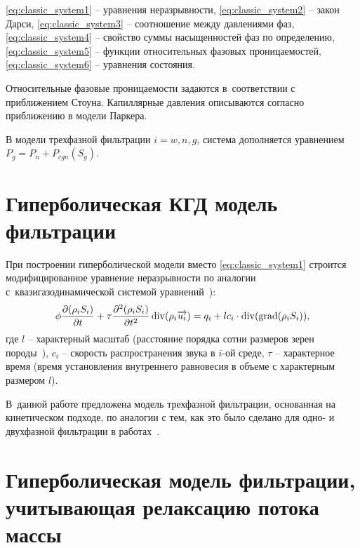\eqref{eq:classic_system1} -- уравнения неразрывности,
\eqref{eq:classic_system2} -- закон Дарси,
\eqref{eq:classic_system3} -- соотношение между давлениями фаз,
\eqref{eq:classic_system4} -- свойство суммы насыщенностей фаз по определению,
\eqref{eq:classic_system5} -- функции относительных фазовых проницаемостей,
\eqref{eq:classic_system6} -- уравнения состояния.

Относительные фазовые проницаемости задаются в~соответствии с~
приближением Стоуна\cite{Aziz-Settari}.
Капиллярные давления описываются согласно приближению в модели Паркера\cite{Parker}.

В модели трехфазной фильтрации $i = w,n,g$, система дополняется уравнением $P_g = P_n + P_{cgn}({S}_g)$.

\section{Гиперболическая КГД модель фильтрации} \label{sec:ch1/sec2}

При построении гиперболической модели вместо \eqref{eq:classic_system1} строится модифицированное уравнение неразрывности по аналогии с~квазигазодинамической системой уравнений~\cite{Chetverushkin-Mathmod}):
\begin{equation}
 \label{mass_mod}
  \phi \frac{\partial (\rho_i S_i)}{\partial t} + \tau \frac{\partial^2 (\rho_i S_i)}{\partial t^2} 
  \mathop{\mathrm{div}}\nolimits(\rho_i \overrightarrow{u_i}) = q_i + l c_i \cdot \mathop{\mathrm{div}}\nolimits(\mathop{\mathrm{grad}}\nolimits(\rho_i S_i)),
\end{equation}
где $l$ -- характерный масштаб (расстояние порядка сотни размеров зерен породы~\cite{Chetverushkin}),
$c_i$ -- скорость распространения звука в $i$-ой среде, $\tau$ -- характерное время (время установления внутреннего равновесия в объеме с характерным размером $l$).

В~данной работе предложена модель трехфазной фильтрации, основанная на кинетическом подходе, по аналогии с тем, как это было сделано для одно- и двухфазной фильтрации в работах~\cite{Mathmod-2010,Mathmod-2011}.

\section{Гиперболическая модель фильтрации, учитывающая релаксацию потока массы} \label{sec:ch1/sec3}

